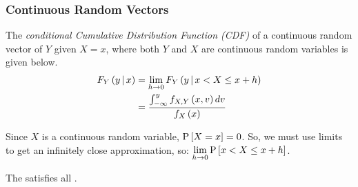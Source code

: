 		\subsubsection{Continuous Random Vectors} \label{subsubsec:Conditional Probability Continuous Random Vectors}
			\begin{definition} \label{def:Continuous Random Vector-Conditional CDF}
				The \emph{conditional Cumulative Distribution Function (CDF)} of a continuous random vector of $Y$ given $X=x$, where both $Y$ and $X$ are continuous random variables is given below.
				\begin{equation}
					\begin{aligned}
						F_{Y} \left( y \operatorname{\vert} x \right) &= \lim\limits_{h \rightarrow 0} F_{Y} \left( y \operatorname{\vert} x < X \leq x+h \right) \\
						&= \frac{\int_{-\infty}^{y} f_{X,Y} \left( x,v \right) dv}{f_{X} \left( x \right)} \\
					\end{aligned}
				\end{equation}
				\begin{remark}
					Since $X$ is a continuous random variable, $\operatorname{\operatorname{P}} \left[ X=x \right] =0$.
					So, we must use limits to get an infinitely close approximation, so: $\lim \limits_{h \rightarrow 0} \operatorname{\operatorname{P}} \left[ x < X \leq x+h \right]$.
				\end{remark}
				\begin{remark}
					The  satisfies all .
				\end{remark}
			\end{definition}
